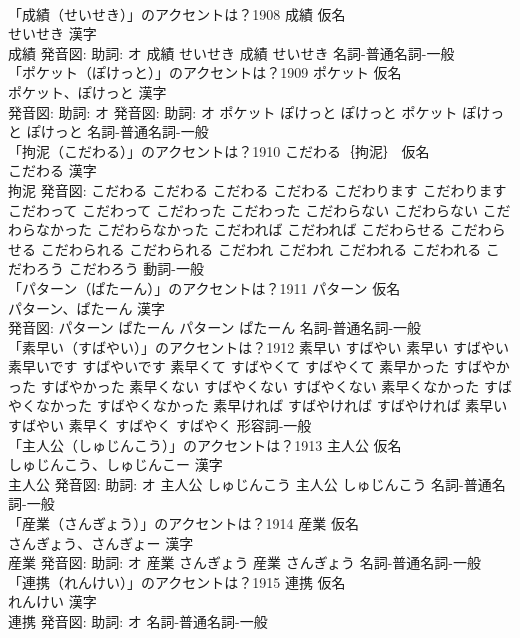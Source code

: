 \documentclass[8pt]{extreport}
\begin{document}
\begin{CJK}{UTF8}{min}
\\	「成績（せいせき）」のアクセントは？1908	成績 仮名　
\\	せいせき 漢字　
\\	成績 発音図: 助詞: オ	成績 せいせき		成績 せいせき				名詞-普通名詞-一般 
\\	「ポケット（ぽけっと）」のアクセントは？1909	ポケット 仮名　
\\	ポケット、ぽけっと 漢字　
\\	発音図: 助詞: オ 発音図: 助詞: オ	ポケット ぽけっと ぽけっと		ポケット ぽけっと ぽけっと				名詞-普通名詞-一般 
\\	「拘泥（こだわる）」のアクセントは？1910	こだわる｛拘泥｝ 仮名　
\\	こだわる 漢字　
\\	拘泥 発音図:	こだわる こだわる		こだわる こだわる こだわります こだわります こだわって こだわって こだわった こだわった こだわらない こだわらない こだわらなかった こだわらなかった こだわれば こだわれば こだわらせる こだわらせる こだわられる こだわられる こだわれ こだわれ こだわれる こだわれる こだわろう こだわろう				動詞-一般 
\\	「パターン（ぱたーん）」のアクセントは？1911	パターン 仮名　
\\	パターン、ぱたーん 漢字　
\\	発音図:	パターン ぱたーん		パターン ぱたーん				名詞-普通名詞-一般 
\\	「素早い（すばやい）」のアクセントは？1912		素早い すばやい		素早い すばやい 素早いです すばやいです 素早くて すばやくて すばやくて 素早かった すばやかった すばやかった 素早くない すばやくない すばやくない 素早くなかった すばやくなかった すばやくなかった 素早ければ すばやければ すばやければ 素早い すばやい 素早く すばやく すばやく				形容詞-一般 
\\	「主人公（しゅじんこう）」のアクセントは？1913	主人公 仮名　
\\	しゅじんこう、しゅじんこー 漢字　
\\	主人公 発音図: 助詞: オ	主人公 しゅじんこう		主人公 しゅじんこう				名詞-普通名詞-一般 
\\	「産業（さんぎょう）」のアクセントは？1914	産業 仮名　
\\	さんぎょう、さんぎょー 漢字　
\\	産業 発音図: 助詞: オ	産業 さんぎょう		産業 さんぎょう				名詞-普通名詞-一般 
\\	「連携（れんけい）」のアクセントは？1915	連携 仮名　
\\	れんけい 漢字　
\\	連携 発音図: 助詞: オ							名詞-普通名詞-一般 

\end{CJK}
\end{document}
